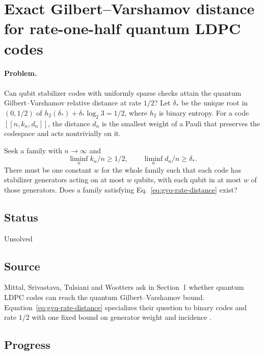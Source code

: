 \section{Exact Gilbert--Varshamov distance for rate-one-half quantum LDPC codes}
\label{sec:op_787284adc73c8f63}

\paragraph{Problem.}
Can qubit stabilizer codes with uniformly sparse checks attain the quantum Gilbert--Varshamov relative distance at rate $1/2$? Let $\delta_*$ be the unique root in $(0,1/2)$ of $h_2(\delta_*)+\delta_*\log_2 3=1/2$, where $h_2$ is binary entropy. For a code $[[n,k_n,d_n]]$, the distance $d_n$ is the smallest weight of a Pauli that preserves the codespace and acts nontrivially on it.

Seek a family with $n\to\infty$ and
\begin{equation}
\liminf_n k_n/n\geq 1/2,\qquad
\liminf_n d_n/n\geq \delta_*.
\label{eq:gvq-rate-distance}
\end{equation}
There must be one constant $w$ for the whole family such that each code has stabilizer generators acting on at most $w$ qubits, with each qubit in at most $w$ of those generators. Does a family satisfying Eq.~\eqref{eq:gvq-rate-distance} exist?

\subsection*{Status}

Unsolved

\subsection*{Source}

Mittal, Srivastava, Tulsiani and Wootters ask in Section~1 whether quantum LDPC codes can reach the quantum Gilbert--Varshamov bound. Equation~\eqref{eq:gvq-rate-distance} specializes their question to binary codes and rate $1/2$ with one fixed bound on generator weight and incidence .

\subsection*{Progress}

